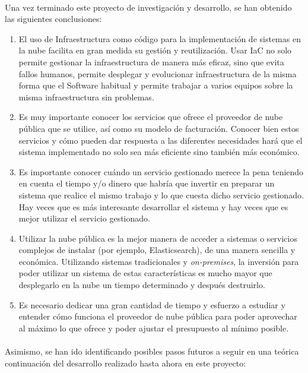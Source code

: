 \documentclass[../../memoria.tex]{subfiles}
\begin{document}
\paragraph{}
Una vez terminado este proyecto de investigación y desarrollo, se han obtenido las siguientes conclusiones:
\begin{enumerate}
    \item El uso de Infraestructura como código para la implementación de sistemas en la nube facilita en gran medida su gestión y reutilización. Usar IaC no solo permite gestionar la infraestructura de manera más eficaz, sino que evita fallos humanos, permite desplegar y evolucionar infraestructura de la misma forma que el Software habitual y permite trabajar a varios equipos sobre la misma infraestructura sin problemas.
    \item Es muy importante conocer los servicios que ofrece el proveedor de nube pública que se utilice, así como su modelo de facturación. Conocer bien estos servicios y cómo pueden dar respuesta a las diferentes necesidades hará que el sistema implementado no solo sea más eficiente sino también más económico.
    \item Es importante conocer cuándo un servicio gestionado merece la pena teniendo en cuenta el tiempo y/o dinero que habría que invertir en preparar un sistema que realice el mismo trabajo y lo que cuesta dicho servicio gestionado. Hay veces que es más interesante desarrollar el sistema y hay veces que es mejor utilizar el servicio gestionado.
    \item Utilizar la nube pública es la mejor manera de acceder a sistemas o servicios complejos de instalar (por ejemplo, Elasticsearch), de una manera sencilla y económica. Utilizando sistemas tradicionales y \textit{on-premises}, la inversión para poder utilizar un sistema de estas características es mucho mayor que desplegarlo en la nube un tiempo determinado y después destruirlo.
    \item Es necesario dedicar una gran cantidad de tiempo y esfuerzo a estudiar y entender cómo funciona el proveedor de nube pública para poder aprovechar al máximo lo que ofrece y poder ajustar el presupuesto al mínimo posible.
\end{enumerate}

\paragraph{}
Asimismo, se han ido identificando posibles pasos futuros a seguir en una teórica continuación del desarrollo realizado hasta ahora en este proyecto:
\end{document}
